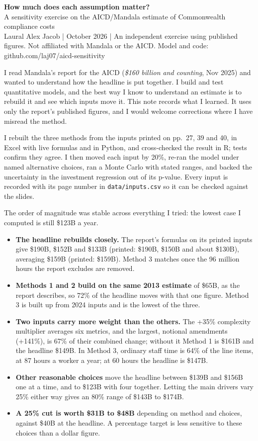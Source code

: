 \documentclass[10pt,a4paper]{article}
\newcommand{\hd}[1]{\par\vspace{3pt}{\large\bfseries #1}\par\vspace{-2pt}}
\begin{document}
{\LARGE\bfseries How much does each assumption matter?}\\[2pt]
{\large A sensitivity exercise on the AICD/Mandala estimate of Commonwealth compliance costs}\\[2pt]
{\small\color{ink2}Laural Alex Jacob \;|\; October 2026 \;|\; An independent exercise using published figures. Not affiliated with Mandala or the AICD. Model and code: github.com/laj07/aicd-sensitivity}

\hd{Why I looked at this}
I read Mandala's report for the AICD (\emph{\$160 billion and counting}, Nov 2025) and wanted to understand how the headline is put together. I build and test quantitative models, and the best way I know to understand an estimate is to rebuild it and see which inputs move it. This note records what I learned. It uses only the report's published figures, and I would welcome corrections where I have misread the method.

\hd{What I did}
I rebuilt the three methods from the inputs printed on pp.\ 27, 39 and 40, in Excel with live formulas and in Python, and cross-checked the result in R; tests confirm they agree. I then moved each input by 20\%, re-ran the model under named alternative choices, ran a Monte Carlo with stated ranges, and backed the uncertainty in the investment regression out of its p-value. Every input is recorded with its page number in \texttt{data/inputs.csv} so it can be checked against the slides.

\hd{What I found}
The order of magnitude was stable across everything I tried: the lowest case I computed is still \$123B a year.
\begin{itemize}
\item \textbf{The headline rebuilds closely.} The report's formulas on its printed inputs give \$190B, \$152B and \$133B (printed: \$190B, \$150B and about \$130B), averaging \$159B (printed: \$159B). Method 3 matches once the 96 million hours the report excludes are removed.
\item \textbf{Methods 1 and 2 build on the same 2013 estimate} of \$65B, as the report describes, so 72\% of the headline moves with that one figure. Method 3 is built up from 2024 inputs and is the lowest of the three.
\item \textbf{Two inputs carry more weight than the others.} The +35\% complexity multiplier averages six metrics, and the largest, notional amendments (+141\%), is 67\% of their combined change; without it Method 1 is \$161B and the headline \$149B. In Method 3, ordinary staff time is 64\% of the line items, at 87 hours a worker a year; at 60 hours the headline is \$147B.
\item \textbf{Other reasonable choices} move the headline between \$139B and \$156B one at a time, and to \$123B with four together. Letting the main drivers vary 25\% either way gives an 80\% range of \$143B to \$174B.
\item \textbf{A 25\% cut is worth \$31B to \$48B} depending on method and choices, against \$40B at the headline. A percentage target is less sensitive to these choices than a dollar figure.
\end{itemize}
\end{document}
